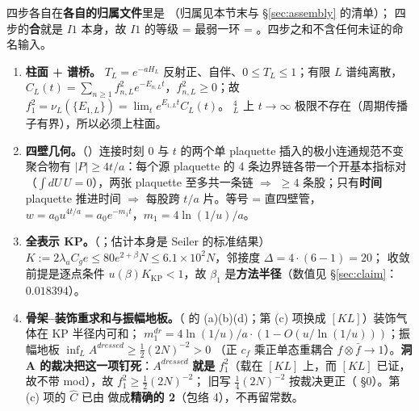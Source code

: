 四步各自在\textbf{各自的归属文件}里是 \LT{}（归属见本节末与 \S\ref{sec:assembly} 的清单）；
四步的\textbf{合}就是 $I1$ 本身，故 $I1$ 的等级 = 最弱一环 = \LT。四步之和不含任何未证的命名输入。

\begin{enumerate}[label=(\arabic*)]
\item \textbf{柱面 + 谱桥。}\LT{} $T_L=e^{-aH_L}$ 反射正、自伴、$0\le T_L\le1$；有限 $L$ 谱纯离散，
$C_L(t)=\sum_{n\ge1}f_{n,L}^2e^{-E_{n,L}t}$，$f_{n,L}^2\ge0$；故 $f_1^2=\nu_L(\{E_{1,L}\})=\lim_te^{E_{1,L}t}C_L(t)$。
$^4_L$ 上 $t\to\infty$ 极限不存在（周期传播子有界），所以必须上柱面。

\item \textbf{四壁几何。}\LT{}（）连接时刻 $0$ 与 $t$ 的两个单 plaquette 插入的极小连通规范不变聚合物有
$|P|\ge4t/a$：每个源 plaquette 的 4 条边界链各带一个开基本指标对（$\int dU\,U=0$），两张 plaquette 至多共一条链
$\Rightarrow$ $\ge4$ 条股；只有\textbf{时间} plaquette 推进时间 $\Rightarrow$ 每股跨 $t/a$ 片。等号 = 直四壁管，
$w=a_0u^{4t/a}=a_0e^{-m_1t}$，$m_1=4\ln(1/u)/a$。

\item \textbf{全表示 KP。}\LT{}（；估计本身是 Seiler 的标准结果）$K:=2\lambda_aC_ge\le80e^{2+\beta}N\le6.1\times10^2N$，邻接度 $\Delta=4\cdot(6-1)=20$；
收敛前提是逐点条件 $u(\beta)K_{\mathrm{KP}}<1$，故 $\beta_1$ 是\textbf{方法半径}（数值见 \S\ref{sec:claim}：$0.018394$）。

\item \textbf{骨架--装饰重求和与振幅地板。}\LT{}（ 的 (a)(b)(d)；第 (c) 项换成 $[KL]$）装饰气体在 KP 半径内可和；
$m_1^{dr}=4\ln(1/u)/a\cdot(1-O(u/\ln(1/u)))$；振幅地板 $\inf_L A^{dressed}\ge\tfrac12(2N)^{-2}>0$
（正 $c_f$ 乘正单态重耦合 $f\otimes\bar f\to1$）。\textbf{洞 A 的裁决把这一项钉死}：$A^{dressed}$ \textbf{就是} $f_1^2$（载在 $[KL]$ 上，而 $[KL]$ 已证，故不带 mod），故 $f_1^2\ge\tfrac12(2N)^{-2}$；
旧写 $\tfrac14(2N)^{-2}$ 按裁决更正（ \S0）。第 (c) 项的 $\hat C$ 已由  做成\textbf{精确的 2}（包络 4），不再留常数。
\end{enumerate}

